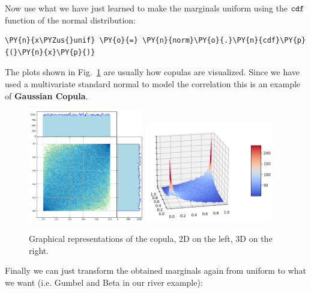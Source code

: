 Now use what we have just learned to make the marginals uniform using
the \(\tt{cdf}\) function of the normal distribution:

\begin{tcolorbox}[breakable, size=fbox, boxrule=1pt, pad at break*=1mm,colback=cellbackground, colframe=cellborder]
\begin{Verbatim}[commandchars=\\\{\}]
\PY{n}{x\PYZus{}unif} \PY{o}{=} \PY{n}{norm}\PY{o}{.}\PY{n}{cdf}\PY{p}{(}\PY{n}{x}\PY{p}{)}
\end{Verbatim}
\end{tcolorbox}

The plots shown in Fig.~\ref{fig:copula} are usually how copulas are visualized. Since we have used a multivariate standard normal 
to model the correlation this is an example of \textbf{Gaussian Copula}.

\begin{figure}[htb]
\centering
\includegraphics[width=0.45\textwidth]{figures/lesson6_16_0.png}
\quad
\includegraphics[width=0.5\textwidth]{figures/copula_3d.png}
\caption{Graphical representations of the copula, 2D on the left, 3D on the right.}
\label{fig:copula}
\end{figure}

Finally we can just transform the obtained marginals again from uniform to what we want
(i.e. Gumbel and Beta in our river example):

